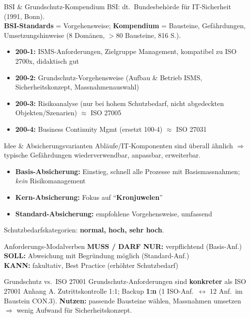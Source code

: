 \documentclass[a4paper, fontsize=7pt]{scrartcl}
\begin{document}
\begin{mainbox}{BSI \& Grundschutz-Kompendium}
BSI: dt.\ Bundesbehörde für IT-Sicherheit (1991, Bonn).\\
\textbf{BSI-Standards} = Vorgehensweise; \textbf{Kompendium} = Bausteine,
Gefährdungen, Umsetzungshinweise (8 Domänen, $>$80 Bausteine, 816 S.).
\begin{itemize}
    \item \textbf{200-1:} ISMS-Anforderungen, Zielgruppe Management, kompatibel
          zu ISO 2700x, didaktisch gut
    \item \textbf{200-2:} Grundschutz-Vorgehensweise (Aufbau \& Betrieb ISMS,
          Sicherheitskonzept, Massnahmenauswahl)
    \item \textbf{200-3:} Risikoanalyse (nur bei hohem Schutzbedarf, nicht
          abgedeckten Objekten/Szenarien) $\approx$ ISO 27005
    \item \textbf{200-4:} Business Continuity Mgmt (ersetzt 100-4)
          $\approx$ ISO 27031
\end{itemize}
\end{mainbox}

\begin{mainbox}{Idee \& Absicherungsvarianten}
Abläufe/IT-Komponenten sind überall ähnlich $\Rightarrow$ typische Gefährdungen
wiederverwendbar, anpassbar, erweiterbar.
\begin{itemize}
    \item \textbf{Basis-Absicherung:} Einstieg, schnell alle Prozesse mit
          Basismassnahmen; \emph{kein} Risikomanagement
    \item \textbf{Kern-Absicherung:} Fokus auf ``\textbf{Kronjuwelen}''
    \item \textbf{Standard-Absicherung:} empfohlene Vorgehensweise, umfassend
\end{itemize}
Schutzbedarfskategorien: \textbf{normal, hoch, sehr hoch}.
\end{mainbox}

\begin{mainbox}{Anforderungs-Modalverben}
\textbf{MUSS / DARF NUR:} verpflichtend (Basis-Anf.)\\
\textbf{SOLL:} Abweichung mit Begründung möglich (Standard-Anf.)\\
\textbf{KANN:} fakultativ, Best Practice (erhöhter Schutzbedarf)
\end{mainbox}

\begin{subbox}{Grundschutz vs.\ ISO 27001}
Grundschutz-Anforderungen sind \textbf{konkreter} als ISO 27001 Anhang A.
Zutrittskontrolle 1:1; Backup \textbf{1:n} (1 ISO-Anf.\ $\leftrightarrow$ 12
Anf.\ im Baustein CON.3). \textbf{Nutzen:} passende Bausteine wählen, Massnahmen
umsetzen $\Rightarrow$ wenig Aufwand für Sicherheitskonzept.
\end{subbox}
\end{document}
